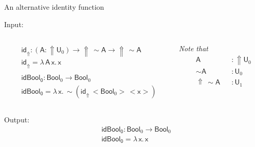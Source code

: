 \documentclass[dvipsnames,aspectratio=169]{beamer}
\newcommand{\msf}[1]{\mathsf{#1}}
\newcommand{\Lift}{{\Uparrow}}
\newcommand{\spl}{{\sim}}
\newcommand{\qut}[1]{{<}#1{>}}
\newcommand{\U}{\msf{U}}
\newcommand{\Bool}{\msf{Bool}}
\newcommand{\id}{\msf{id}}
\theoremstyle{remark}
\newcommand{\msA}{\msf{A}}
\newcommand{\msx}{\msf{x}}
\begin{document}
\begin{frame}{An alternative identity function}


Input:
\begin{columns}
\begin{column}{0.5\textwidth}
\begin{alignat*}{4}
  & \id_\Lift : (\msA : \Lift\U_0) \to \Lift\,\spl{\msA} \to \Lift\,\spl{\msA}\\
  & \id_\Lift = \lambda\,\msA\,\msx.\,\msx     \\
  & \\
  & \msf{idBool_0} : \Bool_0 \to \Bool_0\\
  & \msf{idBool_0} = \lambda\,\msx.\,\spl(\id_\Lift\,\qut{\Bool_0}\,\qut{\msx})
\end{alignat*}
\end{column}
\pause
\begin{column}{0.5\textwidth}
\emph{Note that}
\vspace{-1em}
\begin{alignat*}{4}
  & \msA &&: \Lift\U_0 \\
  & \spl\msA &&: \U_0 \\
  & \Lift\,\spl\msA &&: \U_1
\end{alignat*}

\end{column}
\end{columns}
\vspace{1em}
\pause
Output:
\begin{alignat*}{4}
  & \msf{idBool_0} : \Bool_0 \to \Bool_0\\
  & \msf{idBool_0} = \lambda\,\msx.\,\msx
\end{alignat*}




\end{frame}
\end{document}
